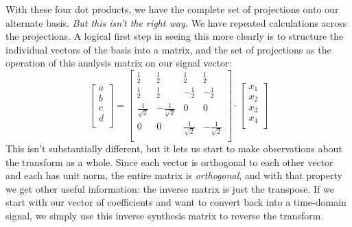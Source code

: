 \documentclass[letterpaper]{article}
\begin{document}
With these four dot products, we have the complete set of projections onto our alternate basis.
\emph{But this isn't the right way.}
We have repeated calculations across the projections.
A logical first step in seeing this more clearly is to structure the individual vectors of the basis into a matrix,
and the set of projections as the operation of this analysis matrix on our signal vector:
\[
\begin{bmatrix}
a \\
b \\
c \\
d \\
\end{bmatrix}
=
\begin{bmatrix}
^1_2                 &   ^1_2                 &   ^1_2                &  ^1_2                 \\
^1_2                 &   ^1_2                 &  -^1_2                &  -^1_2                \\
\tfrac{1}{\sqrt{2}}  &  -\tfrac{1}{\sqrt{2}}  &   0                   &  0                    \\
0                    &   0                    &  \tfrac{1}{\sqrt{2}}  & -\tfrac{1}{\sqrt{2}}  \\
\end{bmatrix}
\cdot
\begin{bmatrix}
x_1 \\
x_2 \\
x_3 \\
x_4 \\
\end{bmatrix}
\]
This isn't substantially different, but it lets us start to make observations about the transform as a whole.
Since each vector is orthogonal to each other vector and each has unit norm, the entire matrix is \emph{orthogonal},
and with that property we get other useful information: the inverse matrix is just the transpose.
If we start with our vector of coefficients and want to convert back into a time-domain signal, we simply use this inverse
synthesis matrix to reverse the transform.
\end{document}
